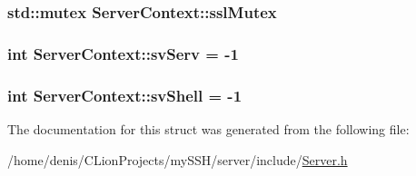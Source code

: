 \subsubsection[{\texorpdfstring{ssl\+Mutex}{sslMutex}}]{\setlength{\rightskip}{0pt plus 5cm}std\+::mutex Server\+Context\+::ssl\+Mutex}\hypertarget{structServerContext_adaf5a8ecb1b63b5dd2b932260fb99145}{}\label{structServerContext_adaf5a8ecb1b63b5dd2b932260fb99145}
\subsubsection[{\texorpdfstring{sv\+Serv}{svServ}}]{\setlength{\rightskip}{0pt plus 5cm}int Server\+Context\+::sv\+Serv = -\/1}\hypertarget{structServerContext_a728b751fab25a3042eb9e6b668bc9fb3}{}\label{structServerContext_a728b751fab25a3042eb9e6b668bc9fb3}
\subsubsection[{\texorpdfstring{sv\+Shell}{svShell}}]{\setlength{\rightskip}{0pt plus 5cm}int Server\+Context\+::sv\+Shell = -\/1}\hypertarget{structServerContext_a2d08d74a2daaedabbcce115bdf8f05fa}{}\label{structServerContext_a2d08d74a2daaedabbcce115bdf8f05fa}


The documentation for this struct was generated from the following file\+:\begin{DoxyCompactItemize}
\item 
/home/denis/\+C\+Lion\+Projects/my\+S\+S\+H/server/include/\hyperlink{Server_8h}{Server.\+h}\end{DoxyCompactItemize}
